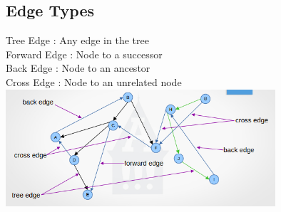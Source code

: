 \documentclass[10pt]{article}
\begin{document}
\subsection{Edge Types}
Tree Edge : Any edge in the tree \\
Forward Edge : Node to a successor \\
Back Edge : Node to an ancestor \\
Cross Edge : Node to an unrelated node \\
\includegraphics[width=10cm]{e5.png}
\end{document}

